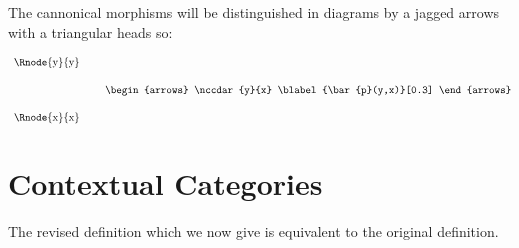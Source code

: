 \documentclass[10pt,a4paper]{scrartcl}
\newcommand{\pbar}{\bar{p}}
\newcommand{\pp}[2]{\pbar(#1,#2)}
\begin{document}
The cannonical morphisms will be distinguished in diagrams by a jagged arrows with  
a triangular heads so:

\begin{equation*}
\begin{array}{p{2cm}p{0.5cm}p{0.5cm}p{0.5cm}}
\Rnode{y}{y}& \\ [1.4cm]
\Rnode{x}{x} \\
\end{array}
\begin{arrows}
\nccdar{y}{x}
\blabel{\pp{y}{x}}[0.3]
\end{arrows}
\end{equation*}


\section{Contextual Categories}

The revised definition which we now give is equivalent to the original definition.
\end{document}
